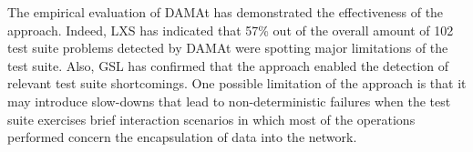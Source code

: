 %
%
%
%
%
%
%

The empirical evaluation of DAMAt has demonstrated the effectiveness of the approach. Indeed, LXS has indicated that 57\% out of the overall amount of 102 test suite problems detected by DAMAt were spotting major limitations of the test suite. Also, GSL has confirmed that the approach enabled the detection of relevant test suite shortcomings.
One possible limitation of the approach is that it may introduce slow-downs that lead to non-deterministic failures when the test suite exercises brief interaction scenarios in which most of the operations performed concern the encapsulation of data into the network.



